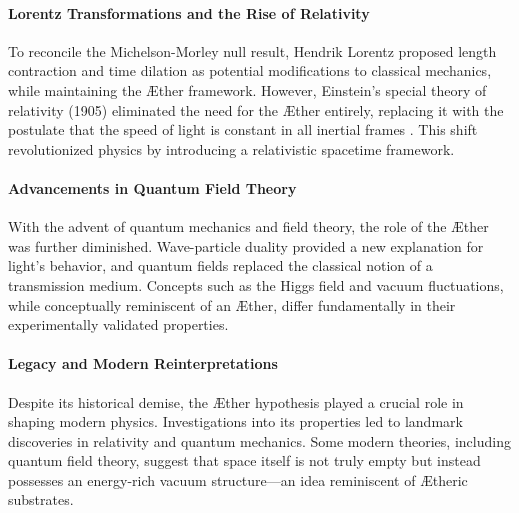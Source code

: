 \paragraph*{Lorentz Transformations and the Rise of Relativity}
To reconcile the Michelson-Morley null result, Hendrik Lorentz proposed length contraction and time dilation as potential modifications to classical mechanics, while maintaining the Æther framework. However, Einstein’s special theory of relativity (1905) eliminated the need for the Æther entirely, replacing it with the postulate that the speed of light is constant in all inertial frames \cite{einstein1905}. This shift revolutionized physics by introducing a relativistic spacetime framework.

\paragraph*{Advancements in Quantum Field Theory}
With the advent of quantum mechanics and field theory, the role of the Æther was further diminished. Wave-particle duality provided a new explanation for light’s behavior, and quantum fields replaced the classical notion of a transmission medium. Concepts such as the Higgs field \cite{higgs1964} and vacuum fluctuations, while conceptually reminiscent of an Æther, differ fundamentally in their experimentally validated properties.

\paragraph*{Legacy and Modern Reinterpretations}
Despite its historical demise, the Æther hypothesis played a crucial role in shaping modern physics. Investigations into its properties led to landmark discoveries in relativity and quantum mechanics. Some modern theories, including quantum field theory, suggest that space itself is not truly empty but instead possesses an energy-rich vacuum structure—an idea reminiscent of Ætheric substrates.
